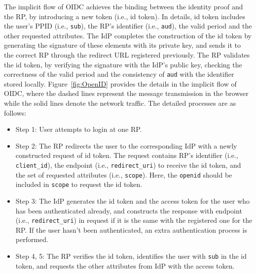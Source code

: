 The implicit flow of OIDC achieves the binding between the identity proof and the RP, by introducing a new token (i.e., id token). In details, id token includes the user's PPID (i.e., \verb+sub+), the RP's identifier (i.e., \verb+aud+), the valid period and the other requested attributes. The IdP completes the construction of the id token by generating the signature of these elements with its private key, and sends it to the correct RP through the redirect URL registered previously.  The RP validates the id token, by verifying the signature with the IdP's public key, checking the correctness of the valid period and the consistency of \verb+aud+ with the identifier stored locally. Figure~\ref{fig:OpenID} provides the details in the implicit flow of OIDC, where the dashed lines represent the message transmission  in  the browser while the solid lines denote the network traffic. The detailed processes are as follows:
\begin{itemize}
    \item Step 1: User attempts to login at one RP.
    \item Step 2: The RP redirects the user to the corresponding IdP with a newly constructed request of id token. The request contains RP's identifier (i.e., \verb+client_id+), the endpoint (i.e., \verb+redirect_uri+) to receive the id token, and the set of requested attributes (i.e., \verb+scope+). Here, the \verb+openid+ should be included in \verb+scope+ to request the id token.
    \item Step 3: The IdP generates the id token and the access token for the user who has been authenticated already, and constructs the response with  endpoint (i.e., \verb+redirect_uri+)  in request if it is the same with the registered one for the RP. If the user hasn't been authenticated, an extra authentication process is performed.
    \item Step 4, 5: The RP verifies the id token, identifies the user with \verb+sub+ in the id token, and requests the other attributes from IdP with the access token.
\end{itemize}
